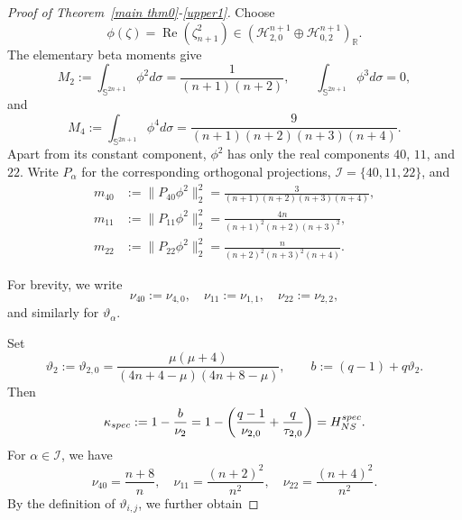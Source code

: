 \documentclass[10pt,a4paper]{amsart}
\begin{document}
\begin{proof}[Proof of Theorem~\ref{main thm0}-\eqref{upper1}]
Choose
\begin{equation}\label{phiLi}
 \phi(\zeta)=\operatorname{Re}(\zeta_{n+1}^2)
 \in(\mathcal H_{2,0}^{n+1}\oplus\mathcal H_{0,2}^{n+1})_{\mathbb R}.
\end{equation}
The elementary beta moments give
\begin{equation*}
 M_2:=\int_{\mathbb S^{2n+1}}\phi^2d\sigma=\frac1{(n+1)(n+2)},\qquad
 \int_{\mathbb S^{2n+1}}\phi^3d\sigma=0,
\end{equation*}
and
\begin{equation*}
 M_4:=\int_{\mathbb S^{2n+1}}\phi^4d\sigma=\frac9{(n+1)(n+2)(n+3)(n+4)}.
\end{equation*}
Apart from its constant component, $\phi^2$ has only the real components
$40$, $11$, and $22$. Write $P_\alpha$ for the corresponding orthogonal projections, $\mathcal I=\{40,11,22\}$, and
\begin{equation}\label{projection-masses}
\begin{aligned}
 m_{40}&:=\|P_{40}\phi^2\|_2^2=\frac3{(n+1)(n+2)(n+3)(n+4)},\\
 m_{11}&:=\|P_{11}\phi^2\|_2^2=\frac{4n}{(n+1)^2(n+2)(n+3)^2},\\
 m_{22}&:=\|P_{22}\phi^2\|_2^2=\frac{n}{(n+2)^2(n+3)^2(n+4)}.
\end{aligned}
\end{equation}

For brevity, we write
\begin{equation*}
  \nu_{40}:=\nu_{4,0},\quad \nu_{11}:=\nu_{1,1},\quad \nu_{22}:=\nu_{2,2},
\end{equation*}
and similarly for $\vartheta_\alpha$.

Set
\begin{equation*}
 \vartheta_2:=\vartheta_{2,0}=\frac{\mu(\mu+4)}{(4n+4-\mu)(4n+8-\mu)},\qquad
 b:=(q-1)+q\vartheta_2.
\end{equation*}
Then
\begin{equation*}
 \kappa_{\rm spec}:=1-\frac b{\nu_2}
 =1-\left(\frac{q-1}{\nu_{2,0}}+\frac q{\tau_{2,0}}\right)
 =H_{NS}^{\rm spec}.
\end{equation*}
For $\alpha\in\mathcal I$,
we have
\begin{equation}\label{higher-eigenvalues}
  \nu_{40}=\frac{n+8}{n},\quad \nu_{11}=\frac{(n+2)^2}{n^2}, \quad \nu_{22}=\frac{(n+4)^2}{n^2}.
\end{equation}
By the definition of $\vartheta_{i,j}$, we further obtain


\end{proof}
\end{document}
